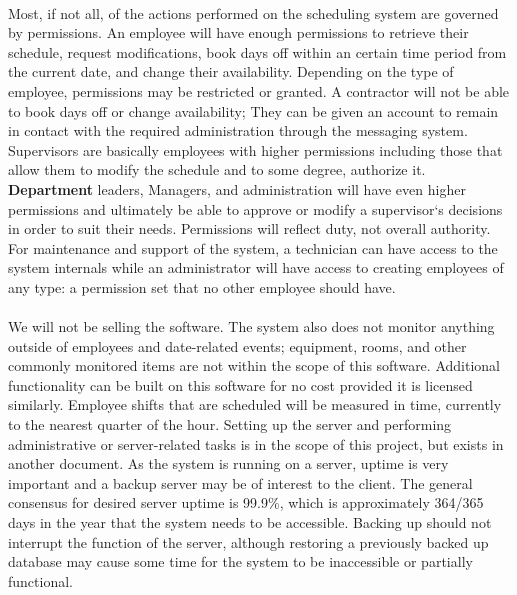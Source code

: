 \documentclass[letterpaper,12pt]{report}
\begin{document}
\paragraph*{}\hspace{0.6cm}
Most, if not all, of the actions performed on the scheduling system are governed by permissions. An employee will have enough permissions to retrieve their schedule, request modifications, book days off within an certain time period from the current date, and change their availability. Depending on the type of employee, permissions may be restricted or granted. A contractor will not be able to book days off or change availability; They can be given an account to remain in contact with the required administration through the messaging system. Supervisors are basically employees with higher  permissions including those that allow them to modify the schedule and to some degree, authorize it. \textbf{Department} leaders, Managers, and administration will have even higher permissions and ultimately be able to approve or modify a supervisor`s decisions in order to suit their needs. Permissions will reflect duty, not overall authority. For maintenance and support of the system, a technician can have access to the system internals while an administrator will have access to creating employees of any type: a permission set that no other employee should have.\pagebreak
\paragraph*{}\hspace{0.6cm}
We will not be selling the software. The system also does not monitor anything outside of employees and date-related events; equipment, rooms, and other commonly monitored items are not within the scope of this software. Additional functionality can be built on this software for no cost provided it is licensed similarly. Employee shifts that are scheduled will be measured in time, currently to the nearest quarter of the hour.
Setting up the server and performing administrative or server-related tasks is in the scope of this project, but exists in another document. As the system is running on a server, uptime is very important and a backup server may be of interest to the client. The general consensus for desired server uptime is 99.9\%, which is approximately 364/365 days in the year that the system needs to be accessible. Backing up should not interrupt the function of the server, although restoring a previously backed up database may cause some time for the system to be inaccessible or partially functional.
\end{document}
